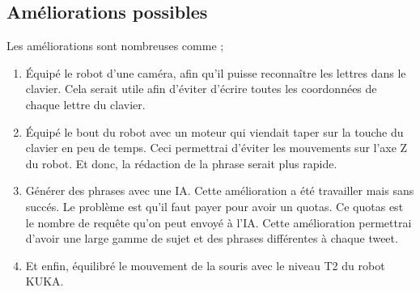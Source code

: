 \documentclass[twoside]{article}
\begin{document}
\begin{multicols}{2}
\section{Améliorations possibles}

Les améliorations sont nombreuses comme ;
\begin{enumerate}
    \item Équipé le robot d'une caméra, afin qu'il puisse reconnaître les lettres dans le clavier. Cela serait utile afin d'éviter d'écrire toutes les coordonnées de chaque lettre du clavier.
    \item Équipé le bout du robot avec un moteur qui viendait taper sur la touche du clavier en peu de temps. Ceci permettrai d'éviter les mouvements sur l'axe Z du robot. Et donc, la rédaction de la phrase serait plus rapide.
    \item Générer des phrases avec une IA. Cette amélioration a été travailler mais sans succés. Le problème est qu'il faut payer pour avoir un quotas. Ce quotas est le nombre de requête qu'on peut envoyé à l'IA. Cette amélioration permettrai d'avoir une large gamme de sujet et des phrases différentes à chaque tweet.
    \item Et enfin, équilibré le mouvement de la souris avec le niveau T2 du robot KUKA.
\end{enumerate}



\end{multicols}
\end{document}
